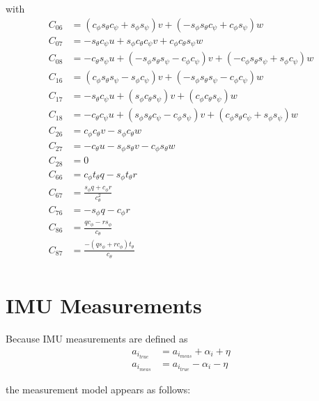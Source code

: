 \documentclass{article}
\newcommand{\cp}{c_{\phi}}
\newcommand{\ct}{c_{\theta}}
\newcommand{\cs}{c_{\psi}}
\newcommand{\sip}{s_{\phi}}
\newcommand{\sit}{s_{\theta}}
\newcommand{\sis}{s_{\psi}}
\newcommand{\tant}{t_{\theta}}
\begin{document}
with
\begin{equation}
	\begin{aligned}
		C_{06} &= (\cp\sit\cs+\sip\sis)v + (-\sip\sit\cs+\cp\sis)w \\
		C_{07} &= -\sit\cs u + \sip\ct\cs v + \cp\ct\sis w \\
		C_{08} &= -\ct\sis u + (-\sip\sit\sis-\cp\cs)v + (-\cp\sit\sis+\sip\cs)w \\
		C_{16} &= (\cp\sit\sis-\sip\cs)v + (-\sip \sit \sis-\cp\cs)w \\
		C_{17} &= -\sit\cs u + (\sip\ct\sis)v + (\cp\ct\sis)w \\
		C_{18} &= -\ct\cs u  + (\sip\sit\cs-\cp\sis)v + (\cp\sit\cs+\sip\sis)w \\
		C_{26} &= \cp\ct v   - \sip\ct w \\
		C_{27} &= -\ct u     - \sip\sit v - \cp\sit w \\
		C_{28} &= 0 \\
		C_{66} &= \cp \tant q-\sip \tant r\\
		C_{67} &= \tfrac{\sip q + \cp r}{c^{2}_{\theta}} \\
		C_{76} &= -\sip q-\cp r \\
		C_{86} &= \tfrac{q \cp-r \sip}{\ct} \\
		C_{87} &= \tfrac{-(q \sip+r \cp) \tant}{\ct} \\
	\end{aligned}
\end{equation}

\section{IMU Measurements}

Because IMU measurements are defined as 
\begin{equation}
\begin{aligned}
	a_{i_{true}} &= a_{i_{meas}} + \alpha_i + \eta \\
	a_{i_{meas}} &= a_{i_{true}} - \alpha_i - \eta
\end{aligned}
\end{equation}

the measurement model appears as follows:
\end{document}
